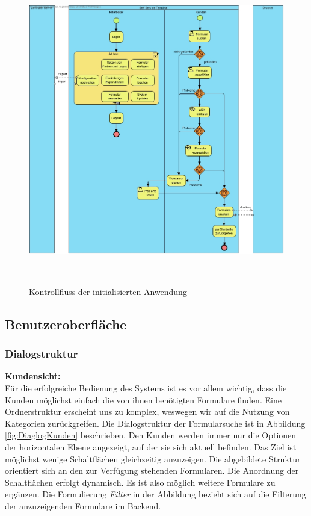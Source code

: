 \newpage


\begin{figure}[htp]
    \flushleft
    \includegraphics[width=14cm , height=13.5cm]{Kapitel/Bilder/SSTKontrollflussv2.jpg}
    \caption{Kontrollfluss der initialisierten Anwendung}
    \label{fig:Kontroll}
\end{figure}

\newpage
\subsection{Benutzeroberfläche}

\subsubsection{Dialogstruktur}

\textbf{Kundensicht:} \\

\noindent Für die erfolgreiche Bedienung des Systems ist es vor allem wichtig, dass die Kunden möglichst einfach die von ihnen benötigten Formulare finden. Eine Ordnerstruktur erscheint uns zu komplex, weswegen wir auf die Nutzung von Kategorien zurückgreifen. Die Dialogstruktur der Formularsuche ist in Abbildung \ref{fig:DiaglogKunden} beschrieben. Den Kunden werden immer nur die Optionen der horizontalen Ebene angezeigt, auf der sie sich aktuell befinden. Das Ziel ist möglichst wenige Schaltflächen gleichzeitig anzuzeigen. Die abgebildete Struktur orientiert sich an den zur Verfügung stehenden Formularen. Die Anordnung der Schaltflächen erfolgt dynamisch. Es ist also möglich weitere Formulare zu ergänzen. Die Formulierung \textit{Filter} in der Abbildung bezieht sich auf die Filterung der anzuzeigenden Formulare im Backend. \\

